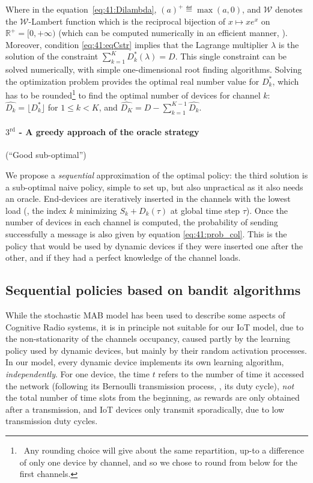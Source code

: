 Where in the equation~\eqref{eq:41:Dilambda}, $(a)^{+} \eqdef \max(a,0)$, and $\mathcal{W}$ denotes the $\mathcal{W}$-Lambert function which is the reciprocal bijection of $x \mapsto x e^x$ on $\mathbb{R^+} = [0, +\infty)$ (which can be computed numerically in an efficient manner, \cite{Corless96}).
Moreover, condition \eqref{eq:41:eqCstr} implies that the Lagrange multiplier $\lambda$ is the solution of the constraint $\sum_{k=1}^{K} D_k^*(\lambda) = D$.
%
This single constraint can be solved numerically, with simple one-dimensional root finding algorithms.
Solving the optimization problem provides the optimal real number value for $D_k^*$, which has to be rounded\footnote{~Any rounding choice will give about the same repartition, up-to a difference of only one device by channel, and so we chose to round from below for the first channels.} to find the optimal number of devices for channel $k$:
%
$\widehat{D_k} = \lfloor D_k^* \rfloor$ for $1 \leq k < K$, and $\widehat{D_{K}} = D - \sum_{k=1}^{K - 1} \widehat{D_k}$.


\paragraph{$3^{\text{rd}}$ - A greedy approach of the oracle strategy} (``\textcolor{deeppurple}{Good sub-optimal}'')

We propose a \emph{sequential} approximation of the optimal policy:
the third solution is a sub-optimal naive policy, simple to set up, but also unpractical as it also needs an oracle.
End-devices are iteratively inserted in the channels with the lowest load (\ie, the index $k$ minimizing $S_k + D_k(\tau)$ at global time step $\tau$). Once the number of devices in each channel is computed, the probability of sending successfully a message is also given by equation \eqref{eq:41:prob_col}.
This is the policy that would be used by dynamic devices if they were inserted one after the other, and if they had a perfect knowledge of the channel loads.


\subsection{Sequential policies based on bandit algorithms}
\label{sub:41:sequentialPolicies}

While the stochastic MAB model has been used to describe some aspects of Cognitive Radio systems, it is in principle not suitable for our IoT model, due to the non-stationarity of the channels occupancy, caused partly by the learning policy used by dynamic devices, but mainly by their random activation processes.
%
In our model, every dynamic device implements its own learning algorithm, \emph{independently}.
For one device, the time $t$ refers to the number of time it accessed the network (following its Bernoulli transmission process, \ie, its duty cycle), \emph{not} the total number of time slots from the beginning, as rewards are only obtained after a transmission, and IoT devices only transmit sporadically, due to low transmission duty cycles.


